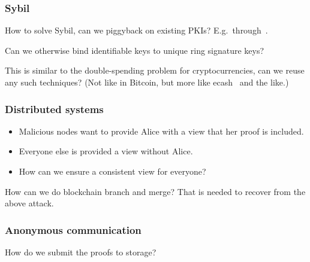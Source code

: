 \begin{frame}
  \frametitle{Sybil}
  \begin{question}
    How to solve Sybil, can we piggyback on existing \acp{PKI}?
    E.g.\ through~\cite{Cinderella}.
  \end{question}

  \begin{question}
    Can we otherwise bind identifiable keys to unique ring signature keys?
  \end{question}

  \begin{question}
    This is similar to the double-spending problem for cryptocurrencies, can 
    we reuse any such techniques?
    (Not like in Bitcoin, but more like ecash~\cite{ecash} and the like.)
  \end{question}
\end{frame}

\begin{frame}
  \frametitle{Distributed systems}
  \begin{question}
    \begin{itemize}
      \item Malicious nodes want to provide Alice with a view that her proof is 
        included.
      \item Everyone else is provided a view without Alice.
      \item How can we ensure a consistent view for everyone?
    \end{itemize}
  \end{question}

  \begin{question}
    How can we do blockchain branch and merge?
    That is needed to recover from the above attack.
  \end{question}
\end{frame}

\begin{frame}
  \frametitle{Anonymous communication}
  \begin{question}
    How do we submit the proofs to storage?
  \end{question}

\end{frame}


